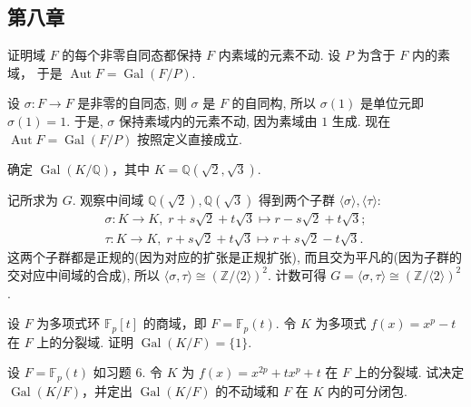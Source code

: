 \subsection{第八章}
\setcounter{pb}{2}
\begin{problem}
    证明域 $ F $ 的每个非零自同态都保持 $ F $ 内素域的元素不动. 设 $ P $ 为含于 $ F $ 内的素域， 于是 $ \operatorname{Aut} F = \operatorname{Gal}(F/P) $.
\end{problem}

\begin{solution}
    设 $\sigma\colon F\to F$ 是非零的自同态, 则 $\sigma$ 是 $F$ 的自同构, 
    所以 $\sigma(1)$ 是单位元即 $\sigma(1)=1$. 于是, $\sigma$ 保持素域内的元素不动, 因为素域由 $1$ 生成. 
    现在 $\operatorname{Aut}F=\operatorname{Gal}(F/P)$ 按照定义直接成立. 
\end{solution}

\setcounter{pb}{4}
\begin{problem}
    确定 $ \operatorname{Gal}(K/\mathbb{Q}) $，其中 $ K = \mathbb{Q}(\sqrt{2}, \sqrt{3}) $.
\end{problem}

\begin{solution}
    记所求为 $G$. 观察中间域 $\mathbb{Q}(\sqrt{2}),\mathbb{Q}(\sqrt{3})$ 得到两个子群 $\langle  \sigma \rangle, \langle \tau \rangle  $:
    \[
        \begin{split}
            \sigma\colon  K\to K,\; r+s\sqrt{2}+t\sqrt{3}\mapsto r-s\sqrt{2}+t\sqrt{3};\\
            \tau\colon  K\to K,\; r+s\sqrt{2}+t\sqrt{3}\mapsto r+s\sqrt{2}-t\sqrt{3}.
        \end{split}
    \]
    这两个子群都是正规的(因为对应的扩张是正规扩张), 而且交为平凡的(因为子群的交对应中间域的合成), 所以 $\langle \sigma,\tau \rangle \cong (\mathbb{Z}/\langle 2 \rangle)^{2} $. 
    计数可得 $G=\langle \sigma,\tau \rangle \cong (\mathbb{Z}/\langle 2 \rangle)^{2}$.
\end{solution}

\setcounter{pb}{6}
\begin{problem}
    设 $ F $ 为多项式环 $ \mathbb{F}_p[t] $ 的商域，即 $ F = \mathbb{F}_p(t) $. 
    令 $ K $ 为多项式 $ f(x) = x^p - t $ 在 $ F $ 上的分裂域. 
    证明 $ \operatorname{Gal}(K/F) = \{1\} $.
\end{problem}

\begin{problem}
    设 $ F = \mathbb{F}_p(t) $ 如习题 6. 
    令 $ K $ 为 $ f(x) = x^{2p} + t x^p + t $ 在 $ F $ 上的分裂域. 
    试决定 $ \operatorname{Gal}(K/F) $，并定出 $ \operatorname{Gal}(K/F) $ 的不动域和 $ F $ 在 $ K $ 内的可分闭包. 
\end{problem}

